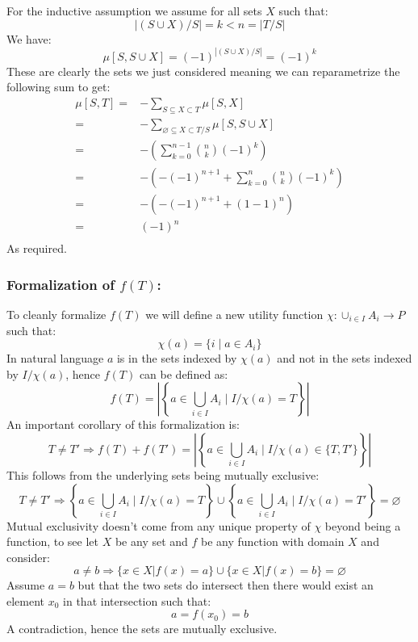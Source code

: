 For the inductive assumption we assume for all sets $X$ such that:
\[|(S\cup X)/S| = k < n = |T/S|\]
We have:
\[\mu[S,S\cup X] = (-1)^{|(S\cup X)/S|} = (-1)^k\]
These are clearly the sets we just considered meaning we can reparametrize the following sum to get:
\begin{equation*}
\begin{aligned}
	\mu[S,T] =& -\sum_{S\subseteq X\subset T}\mu[S,X] \\
	=&-\sum_{\varnothing\subseteq X\subset T/S}\mu[S,S\cup X]\\
	=& -\left(\sum_{k=0}^{n-1}\binom{n}{k}(-1)^k\right)\\
	=& -\left(-(-1)^{n+1}+\sum_{k=0}^{n}\binom{n}{k}(-1)^k\right)\\
	=& -\left(-(-1)^{n+1}+(1-1)^n\right)\\
	=& (-1)^{n}\\
\end{aligned}
\end{equation*}
As required.

\subsubsection{Formalization of $f(T)$:}
To cleanly formalize $f(T)$ we will define a new utility function $\chi:\cup_{i\in I}A_i \rightarrow P$ such that:
\[\chi(a) = \{i\mid a\in A_i\}\]
In natural language $a$ is in the sets indexed by $\chi(a)$ and not in the sets indexed by $I/\chi(a)$,
hence $f(T)$ can be defined as:
\[f(T) = \left|\left\{a\in \bigcup_{i\in I}A_i \mid I/\chi(a)=T\right\}\right|\]
An important corollary of this formalization is:
\[T\neq T' \Rightarrow f(T)+f(T') =\left|\left\{a\in \bigcup_{i\in I}A_i \mid I/\chi(a)\in\{T,T'\}\right\}\right| \]
This follows from the underlying sets being mutually exclusive:
\[T\neq T' \Rightarrow \left\{a\in \bigcup_{i\in I}A_i \mid I/\chi(a)=T\right\}\cup\left\{a\in \bigcup_{i\in I}A_i \mid I/\chi(a)=T'\right\}=\varnothing\]
Mutual exclusivity doesn't come from any unique property of $\chi$ beyond being a function,
to see let $X$ be any set and $f$ be any function with domain $X$ and consider:
\[a\neq b\Rightarrow\{x\in X | f(x) = a\}\cup\{x\in X| f(x) = b\} = \varnothing\]
Assume $a=b$ but that the two sets do intersect then there would exist an element $x_0$ in that intersection such that:
\[a = f(x_0) = b\]
A contradiction, hence the sets are mutually exclusive.

